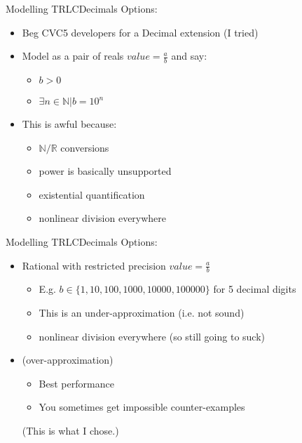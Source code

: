 \documentclass[aspectratio=169]{beamer}
\begin{document}
\begin{frame}{Modelling TRLC}{Decimals}
  Options:
  \begin{itemize}
  \item Beg CVC5 developers for a Decimal extension (I tried)
    \pause
  \item Model as a pair of reals $value = \frac{a}{b}$ and say:
    \begin{itemize}
    \item $b > 0$
    \item $\exists n \in \mathbb{N} | b = 10^n$
    \end{itemize}
    \pause
  \item This is awful because:
    \begin{itemize}
    \item $\mathbb{N} / \mathbb{R}$ conversions
    \item power is basically unsupported
    \item existential quantification
    \item nonlinear division everywhere
    \end{itemize}
  \end{itemize}
\end{frame}

\begin{frame}{Modelling TRLC}{Decimals}
  Options:
  \begin{itemize}
  \item Rational with restricted precision $value = \frac{a}{b}$
    \begin{itemize}
    \item E.g. $b \in \{1, 10, 100, 1000, 10000, 100000\}$ for 5
      decimal digits
    \item This is an under-approximation (i.e. not sound)
    \item nonlinear division everywhere (so still going to suck)
    \end{itemize}
    \pause
  \item {} (over-approximation)
    \begin{itemize}
    \item Best performance
    \item You sometimes get impossible counter-examples
    \end{itemize}
    (This is what I chose.)
  \end{itemize}
\end{frame}
\end{document}
